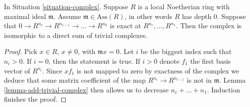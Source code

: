 \begin{lemma}
\label{lemma-exact-depth-zero-local}
In Situation \ref{situation-complex}. Suppose $R$ is
a local Noetherian ring with maximal ideal $\mathfrak m$.
Assume $\mathfrak m \in \text{Ass}(R)$, in other words
$R$ has depth $0$. Suppose that
$0 \to R^{n_e} \to R^{n_{e-1}} \to \ldots \to R^{n_0}$
is exact at $R^{n_e}, \ldots, R^{n_1}$.
Then the complex is isomorphic to a direct sum of trivial
complexes.
\end{lemma}

\begin{proof}
Pick $x \in R$, $x \not = 0$, with $\mathfrak m x = 0$.
Let $i$ be the biggest index such that $n_i > 0$.
If $i = 0$, then the statement is true. If
$i > 0$ denote $f_1$ the first basis vector of $R^{n_i}$.
Since $xf_1$ is not mapped to zero by
exactness of the complex we deduce that some matrix
coefficient of the map $R^{n_i} \to R^{n_{i - 1}}$
is not in $\mathfrak m$.
Lemma \ref{lemma-add-trivial-complex} then allows
us to decrease $n_e + \ldots + n_1$. Induction finishes the proof.
\end{proof}
